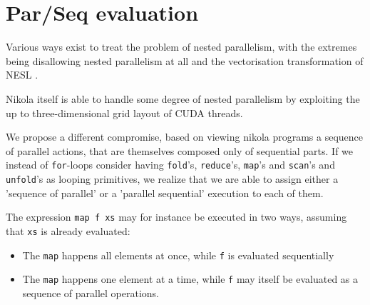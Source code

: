 \chapter{Par/Seq evaluation}



Various ways exist to treat the problem of nested parallelism, with the
extremes being disallowing nested parallelism at all and the vectorisation
transformation of NESL \cite{nesl}.

Nikola itself is able to handle some degree of nested parallelism by exploiting
the up to three-dimensional grid layout of CUDA threads.


We propose a different compromise, based on viewing nikola programs a sequence
of parallel actions, that are themselves composed only of sequential parts.  If we instead of
\texttt{for}-loops consider having \texttt{fold}'s, \texttt{reduce}'s, \texttt{map}'s
and \texttt{scan}'s and \texttt{unfold}'s as looping primitives, we realize that
we are able to assign either a 'sequence of parallel' or a 'parallel sequential'
execution to each of them.


The expression \texttt{map f xs} may for instance be executed in two ways,
assuming that \texttt{xs} is already evaluated:

\begin{itemize}

\item The \texttt{map} happens all elements at once, while \texttt{f} is
evaluated sequentially

\item The \texttt{map} happens one element at a time, while \texttt{f} may itself
be evaluated as a sequence of parallel operations.

\end{itemize}

